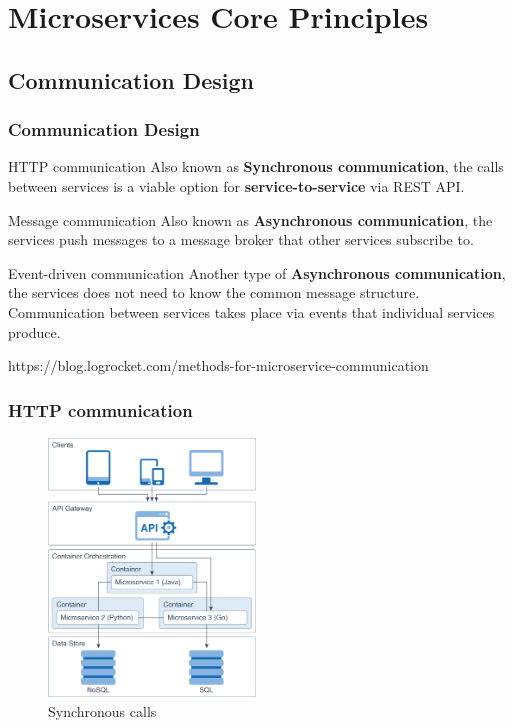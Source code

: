 \documentclass{beamer}
\begin{document}
\section {Microservices Core Principles}
	\subsection {Communication Design}
		\begin{frame}[label=cd]
			\frametitle{Communication Design}
				\begin{block} {HTTP communication}
					Also known as \textbf{Synchronous communication}, the calls between services is a viable option for \textbf{service-to-service} via REST API.
				\end{block}
				
				\vspace{2mm}
				\begin{block} {Message communication}
					Also known as \textbf{Asynchronous communication}, the services push messages to a message broker that other services subscribe to.
				\end{block}
			
			\vspace{2mm}
			\begin{block} {Event-driven communication}
				Another type of \textbf{Asynchronous communication}, the services does not need to know the common message structure. Communication between services takes place via events that individual services produce.
			\end{block}
		
		\vspace{5mm}
		\tiny {https://blog.logrocket.com/methods-for-microservice-communication}
		\end{frame}
	
	\begin{frame}
		\frametitle{HTTP communication}
			\begin{figure}[h]
				\includegraphics[width=55mm, scale=1]{img/microservice_architecture.png}
				\caption{Synchronous calls}
			\end{figure}
	\end{frame}
\end{document}
